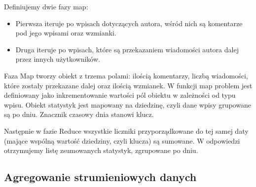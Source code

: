 

Definiujemy dwie fazy map:

\begin{itemize}[noitemsep]
  \item Pierwsza iteruje po wpisach dotyczących autora, wśród nich są komentarze pod jego wpisami oraz wzmianki.
  \item Druga iteruje po wpisach, które są przekazaniem wiadomości autora dalej przez innych użytkowników.
\end{itemize}

Faza Map tworzy obiekt z trzema polami: ilością komentarzy, liczbą wiadomości, które zostały przekazane dalej oraz ilością wzmianek. W funkcji map problem jest definiowany jako inkrementowanie wartości pól obiektu w zależności od typu wpisu. Obiekt statystyk jest mapowany na dziedzinę, czyli dane wpisy grupowane są po dniu. Znacznik czasowy dnia stanowi klucz.

Następnie w fazie Reduce wszystkie liczniki przyporządkowane do tej samej daty (mające wspólną wartość dziedziny, czyli klucza) są sumowane. W odpowiedzi otrzymujemy listę zsumowanych statystyk, zgrupowane po dniu.

\subsection{Agregowanie strumieniowych danych}


